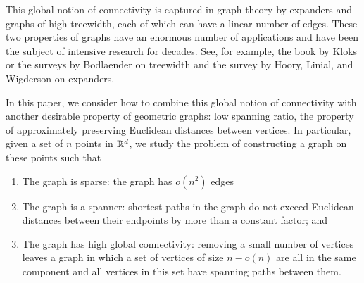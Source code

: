 \documentclass{cccg12}
\begin{document}
This global notion of connectivity is captured in graph theory by
expanders and graphs of high treewidth, each of which can have a linear
number of edges.  These two properties of graphs have an enormous number
of applications and have been the subject of intensive research for
decades.  See, for example, the book by Kloks \cite{k94} or the surveys
by Bodlaender \cite{b98,b07} on treewidth and the survey by Hoory, Linial,
and Wigderson \cite{hlw06} on expanders.

In this paper, we consider how to combine this global notion of
connectivity with another desirable property of geometric graphs: low
spanning ratio,  the property of approximately preserving Euclidean
distances between vertices.  In particular, given a set of $n$ points
in $\mathbb{R}^d$, we study the problem of constructing a graph on these points
such that
\begin{enumerate}
  \item The graph is sparse: the graph has $o(n^2)$ edges
  \item The graph is a spanner: shortest paths in the graph do not exceed
  Euclidean distances between their endpoints by more than a constant
  factor; and
  \item The graph has high global connectivity: removing a small number
  of vertices leaves a graph in which a set of vertices of size $n-o(n)$
  are all in the same component and all vertices in this set have
  spanning paths between them.
\end{enumerate}

\end{document}
